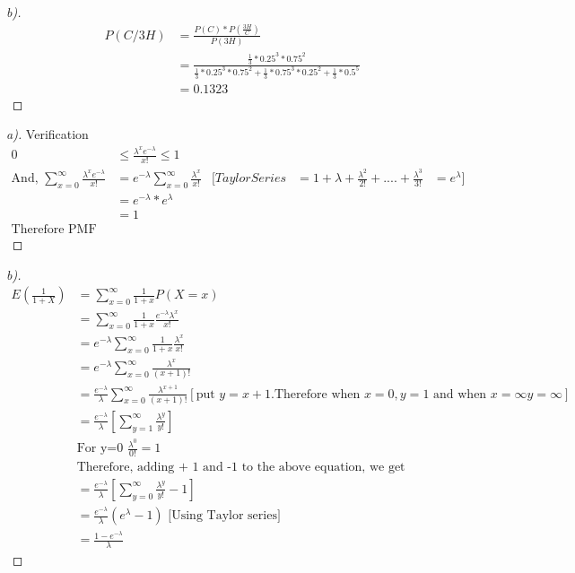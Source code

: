 \documentclass[12pt]{article}
\newenvironment{theorem}[2][Theorem]{\begin{trivlist}
\item[\hskip \labelsep {\bfseries #1}\hskip \labelsep {\bfseries #2.}]}{\end{trivlist}}
\begin{document}
\begin{proof}[b)]
\begin{align*}
P(C/3H) &= \frac{P(C)*P(\frac{3H}{C})}{P(3H)}\\
&= \frac{\frac{1}{3}*0.25^{3}*0.75^{2}}{\frac{1}{3}*0.25^{3}*0.75^{2}+\frac{1}{3}*0.75^{3}*0.25^{2} + \frac{1}{3}*0.5^{5}} \\
&=0.1323
\end{align*}
\end{proof}
\pagebreak
\begin{theorem}[Ans]{3}
\begin{proof}[a)] Verification \\
\begin{align*}
0 &\leq \frac{\lambda^{x}e^{-\lambda}}{x!} \leq 1 \\ \text{And, }
\sum_{x=0}^{\infty} \frac{\lambda^{x}e^{-\lambda}}{x!}    
&= e^{-\lambda} \sum_{x=0}^{\infty}\frac{\lambda^{x}}{x!} & [Taylor Series &= 1+\lambda + \frac{\lambda^{2}}{2!}+....+\frac{\lambda^{3}}{3!} &= e^{\lambda}] \\
&= e^{-\lambda}*e^{\lambda}\\
&= 1 \\
\text{Therefore PMF is valid}
\end{align*}
\end{proof}

\begin{proof}[b)] 
\begin{align*}
E(\frac{1}{1+X}) &= \sum_{x=0}^{\infty} \frac{1}{1+x} P(X=x) \\   
&= \sum_{x=0}^{\infty} \frac{1}{1+x}  \frac{e^{-\lambda}\lambda^{x}}{x!}\\
&= e^{-\lambda}\sum_{x=0}^{\infty} \frac{1}{1+x}  \frac{\lambda^{x}}{x!}\\
&= e^{-\lambda}\sum_{x=0}^{\infty} \frac{\lambda^{x}}{(x+1)!}\\
&= \frac{e^{-\lambda}}{\lambda}\sum_{x=0}^{\infty} \frac{\lambda^{x+1}}{(x+1)!} [\text{put } y=x+1. \text{Therefore when } x=0, y=1 \text{ and when } x=\infty y=\infty]\\
&= \frac{e^{-\lambda}}{\lambda}[\sum_{y=1}^{\infty}\frac{\lambda^{y}}{y!}] \\
&\text{For y=0 } \frac{\lambda^{0}}{0!}=1 \\
&\text{Therefore, adding + 1 and -1 to the above equation, we get }\\
&= \frac{e^{-\lambda}}{\lambda}[\sum_{y=0}^{\infty}\frac{\lambda^{y}}{y!}-1]\\
&=\frac{e^{-\lambda}}{\lambda}(e^{\lambda}-1) \text{ [Using Taylor series]}\\
&= \frac{1-e^{-\lambda}}{\lambda}
\end{align*}
\end{proof}
\end{theorem}
\end{document}
